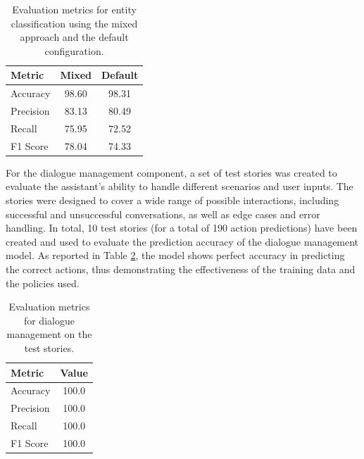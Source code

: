 \documentclass[twocolumn]{article}
\begin{document}
\begin{table}[ht]
    \centering
    \begin{tabular}{lcc}
        \toprule
        \textbf{Metric} & \textbf{Mixed} & \textbf{Default} \\
        \midrule
        Accuracy        & 98.60          & 98.31            \\
        Precision       & 83.13          & 80.49            \\
        Recall          & 75.95          & 72.52            \\
        F1 Score        & 78.04          & 74.33            \\
        \bottomrule
    \end{tabular}
    \captionsetup{margin=0.5cm}
    \caption{Evaluation metrics for entity classification using the mixed approach and the default configuration.}
    \label{tab:entity-evaluation}
\end{table}

For the dialogue management component, a set of test stories was created to evaluate the assistant's ability to handle different scenarios and user inputs. The stories were designed to cover a wide range of possible interactions, including successful and unsuccessful conversations, as well as edge cases and error handling. In total, 10 test stories (for a total of 190 action predictions) have been created and used to evaluate the prediction accuracy of the dialogue management model. As reported in Table \ref{tab:dialogue-evaluation}, the model shows perfect accuracy in predicting the correct actions, thus demonstrating the effectiveness of the training data and the policies used.

\begin{table}[ht]
    \centering
    \begin{tabular}{lc}
        \toprule
        \textbf{Metric} & \textbf{Value} \\
        \midrule
        Accuracy        & 100.0          \\
        Precision       & 100.0          \\
        Recall          & 100.0          \\
        F1 Score        & 100.0          \\
        \bottomrule
    \end{tabular}
    \captionsetup{margin=0.5cm}
    \caption{Evaluation metrics for dialogue management on the test stories.}
    \label{tab:dialogue-evaluation}
\end{table}
\end{document}
